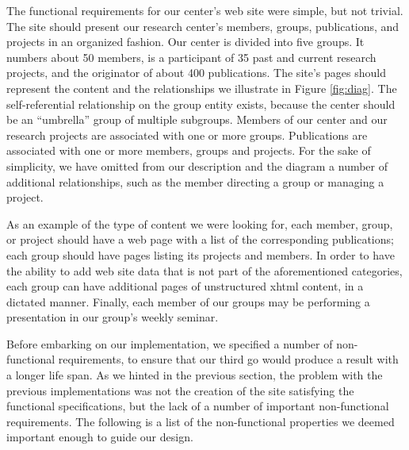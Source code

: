\documentclass{elsart}
\begin{document}
The functional requirements for our center's web site were
simple, but not trivial.
The site should present our research center's members, groups, publications,
and projects in an organized fashion.
Our center is divided into five groups.
It numbers about 50 members, is a participant of 35 past and current research
projects, and the originator of about 400 publications.
The site's pages should represent the content and the relationships
we illustrate in Figure \ref{fig:diag}.
The self-referential relationship on the group entity exists, because the center should be an ``umbrella'' group of multiple subgroups. Members of our center and our research projects are associated
with one or more groups.
Publications are associated
with one or more members, groups and projects.
For the sake of simplicity,
we have omitted from our description and the diagram
a number of additional relationships,
such as the member directing a group or managing a project.

As an example of the type of content we were looking for, 
each member, group, or project should have a web page with a list
of the corresponding publications;
each group should have pages listing its projects and members. 
In order to have the ability to add web site data that is not part of the aforementioned categories,
each group can have additional pages of unstructured {\sc xhtml} content, in a dictated manner.
Finally, each member of our groups may be performing a presentation in our group's weekly seminar.

Before embarking on our implementation,
we specified a number of non-functional requirements, to ensure that our 
third go would produce a result with a longer life span.
As we hinted in the previous section, the problem with
the previous implementations was not the creation of the site
satisfying the functional specifications,
but the lack of a number of important non-functional requirements.
The following is a list of the non-functional properties
we deemed important enough to guide our design.
\end{document}
